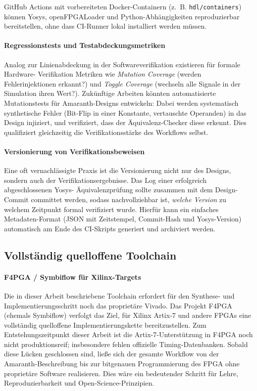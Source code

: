 ﻿\documentclass[12pt,a4paper]{report}
\begin{document}
GitHub Actions mit vorbereiteten Docker-Containern (z.~B.
\texttt{hdl/containers}) können Yosys, openFPGALoader und Python-Abhängigkeiten
reproduzierbar bereitstellen, ohne dass CI-Runner lokal installiert werden müssen.

\paragraph{Regressionstests und Testabdeckungsmetriken}
Analog zur Linienabdeckung in der Softwareverifikation existieren für formale Hardware-
Verifikation Metriken wie \textit{Mutation Coverage} (werden Fehlerinjektionen erkannt?)
und \textit{Toggle Coverage} (wechseln alle Signale in der Simulation ihren Wert?).
Zukünftige Arbeiten könnten automatisierte Mutationstests für Amaranth-Designs entwickeln:
Dabei werden systematisch synthetische Fehler (Bit-Flip in einer Konstante, vertauschte
Operanden) in das Design injiziert, und verifiziert, dass der Äquivalenz-Checker diese
erkennt. Dies qualifiziert gleichzeitig die Verifikationsstärke des Workflows selbst.

\paragraph{Versionierung von Verifikationsbeweisen}
Eine oft vernachlässigte Praxis ist die Versionierung nicht nur des Designs, sondern
auch der Verifikationsergebnisse. Das Log einer erfolgreich abgeschlossenen Yosys-
Äquivalenzprüfung sollte zusammen mit dem Design-Commit committet werden, sodass
nachvollziehbar ist, \textit{welche Version} zu welchem Zeitpunkt formal verifiziert
wurde. Hierfür kann ein einfaches Metadaten-Format (JSON mit Zeitstempel, Commit-Hash
und Yosys-Version) automatisch am Ende des CI-Skripts generiert und archiviert werden.

\subsection{Vollständig quelloffene Toolchain}

\paragraph{F4PGA / Symbiflow für Xilinx-Targets}
Die in dieser Arbeit beschriebene Toolchain erfordert für den Synthese- und
Implementierungsschritt noch das proprietäre Vivado. Das Projekt F4PGA (ehemals
Symbiflow) \cite{f4pga2024} verfolgt das Ziel, für Xilinx Artix-7 und andere FPGAs
eine vollständig quelloffene Implementierungskette bereitzustellen. Zum
Entstehungszeitpunkt dieser Arbeit ist die Artix-7-Unterstützung in F4PGA noch nicht
produktionsreif; insbesondere fehlen offizielle Timing-Datenbanken. Sobald diese Lücken
geschlossen sind, ließe sich der gesamte Workflow von der Amaranth-Beschreibung bis
zur bitgenauen Programmierung des FPGA ohne proprietäre Software realisieren. Dies wäre
ein bedeutender Schritt für Lehre, Reproduzierbarkeit und Open-Science-Prinzipien.
\end{document}
